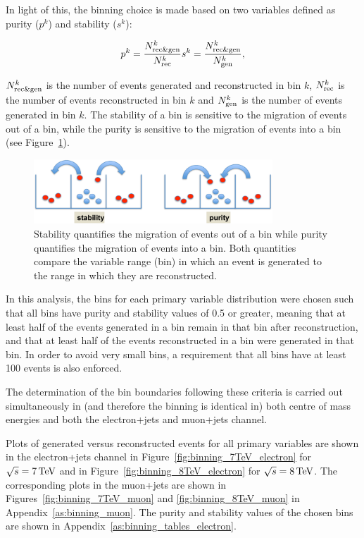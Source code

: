 In light of this, the binning choice is made based on two variables defined as purity ($p^k$) and stability
($s^k$):

\begin{eqnarray}
\label{eq:purity_and_stability}
p^k = \frac{N_{\mathrm{rec}\&\mathrm{gen}}^k}{N_{\mathrm{rec}}^k}
s^k = \frac{N_{\mathrm{rec}\&\mathrm{gen}}^k}{N_{\mathrm{gen}}^k}
,
\end{eqnarray}

$N_{\mathrm{rec}\&\mathrm{gen}}^k$ is the number of events generated and reconstructed in bin $k$,
$N_{\mathrm{rec}}^k$ is the number of events reconstructed in bin $k$ and $N_{\mathrm{gen}}^k$ is the number of events
generated in bin $k$. The stability of a bin is sensitive to the migration of events out of a bin, while
the purity is sensitive to the migration of events into a bin (see Figure~\ref{fig:purity_and_stability}).

\begin{figure}[hbtp]
	\centering
     \includegraphics[width=0.8\textwidth]{Chapters/04_Analysis/04b_XSections/images/purity_and_stability.pdf}
     \caption{Stability quantifies the migration of events out of a bin while purity quantifies the migration
     of events into a bin. Both quantities compare the variable range (bin) in which an event is generated to
     the range in which they are reconstructed.}
     \label{fig:purity_and_stability}
 \end{figure}

In this analysis, the bins for each primary variable distribution were chosen such that all bins have purity
and stability values of 0.5 or greater, meaning that at least half of the events generated in a bin remain in that bin
after reconstruction, and that at least half of the events reconstructed in a bin were generated in that bin.
In order to avoid very small bins, a requirement that all bins have at least 100 events is also enforced.

The determination of the bin boundaries following these criteria is carried out simultaneously in (and
therefore the binning is identical in) both centre of mass energies and both the electron+jets and
muon+jets channel.

Plots of generated versus reconstructed events for all primary variables are shown in the electron+jets
channel in Figure~\ref{fig:binning_7TeV_electron} for $\sqrt{s}=7\,\text{Te\hspace{-.08em}V}$ and in
Figure~\ref{fig:binning_8TeV_electron} for $\sqrt{s}=8\,\text{Te\hspace{-.08em}V}$. The corresponding plots in the muon+jets are
shown in Figures~\ref{fig:binning_7TeV_muon} and \ref{fig:binning_8TeV_muon} in
Appendix~\ref{as:binning_muon}. The purity and stability values of the chosen bins are shown in
Appendix~\ref{as:binning_tables_electron}.

